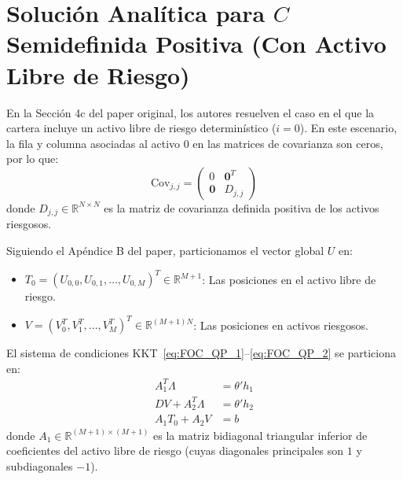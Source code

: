 \documentclass[11pt,a4paper]{report}
\numberwithin{equation}{chapter}
\begin{document}
\section{Solución Analítica para $C$ Semidefinida Positiva (Con Activo Libre de Riesgo)}

En la Sección 4c del paper original, los autores resuelven el caso en el que la cartera incluye un activo libre de riesgo determinístico ($i=0$). En este escenario, la fila y columna asociadas al activo 0 en las matrices de covarianza son ceros, por lo que:
\begin{equation}
    \mathrm{Cov}_{j,j} = \begin{pmatrix} 0 & \mathbf{0}^T \\ \mathbf{0} & D_{j,j} \end{pmatrix}
\end{equation}
donde $D_{j,j} \in \mathbb{R}^{N \times N}$ es la matriz de covarianza definida positiva de los activos riesgosos.

Siguiendo el Apéndice B del paper, particionamos el vector global $U$ en:
\begin{itemize}
    \item $T_0 = (U_{0,0}, U_{0,1}, \dots, U_{0,M})^T \in \mathbb{R}^{M+1}$: Las posiciones en el activo libre de riesgo.
    \item $V = (V_0^T, V_1^T, \dots, V_M^T)^T \in \mathbb{R}^{(M+1)N}$: Las posiciones en activos riesgosos.
\end{itemize}
El sistema de condiciones KKT~\eqref{eq:FOC_QP_1}--\eqref{eq:FOC_QP_2} se particiona en:
\begin{align}
    A_1^T \Lambda &= \theta' h_1 \label{eq:part_1} \\
    D V + A_2^T \Lambda &= \theta' h_2 \label{eq:part_2} \\
    A_1 T_0 + A_2 V &= b \label{eq:part_3}
\end{align}
donde $A_1 \in \mathbb{R}^{(M+1)\times(M+1)}$ es la matriz bidiagonal triangular inferior de coeficientes del activo libre de riesgo (cuyas diagonales principales son $1$ y subdiagonales $-1$). 
\end{document}
